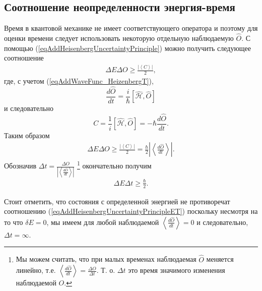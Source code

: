 \subsection{Соотношение неопределенности энергия-время}
\label{AddHeisenbergUncertaintyPrincipleEnergyTime}
Время в квантовой механике не имеет соответствующего оператора и
поэтому для оценки времени следует использовать некоторую отдельную
наблюдаемую $\hat{O}$. С помощью
(\ref{eqAddHeisenbergUncertaintyPrinciple}) можно получить следующее
соотношение
\begin{eqnarray}
  \Delta E \Delta O \ge \frac{\left|\left< C \right>\right|}{2},
  \nonumber
\end{eqnarray}
где, с учетом (\ref{eqAddWaveFunc_HeizenbergT}),
\[
\frac{d \hat{O}}{d t} = \frac{i}{\hbar}
\left[\hat{\mathcal{H}}, \hat{O}\right]
\]
и следовательно
\[
C = \frac{1}{i}\left[\hat{\mathcal{H}}, \hat{O}\right] =
- \hbar \frac{d \hat{O}}{d t}.
\]
Таким образом
\begin{eqnarray}
  \Delta E \Delta O \ge \frac{\left|\left< C \right>\right|}{2} =
  \frac{\hbar}{2}\left|\left<\frac{d \hat{O}}{d t}\right>\right|.
  \nonumber
\end{eqnarray}
Обозначив $\Delta t = \frac{\Delta O}{\left|\left<\frac{d \hat{O}}{d
    t}\right>\right|}$
\footnote{
  Мы можем считать, что при малых временах наблюдаемая $\hat{O}$
  меняется линейно, т.е. $\left<\frac{d \hat{O}}{dt}\right> =
  \frac{\Delta O}{\Delta t}$. Т. о. $\Delta t$ это время значимого
  изменения наблюдаемой $O$. 
}
окончательно получим
\begin{eqnarray}
  \Delta E \Delta t \ge \frac{\hbar}{2}.
  \label{eqAddHeisenbergUncertaintyPrincipleET}
\end{eqnarray}

Стоит отметить, что состояния с определенной энергией не противоречат
соотношению (\ref{eqAddHeisenbergUncertaintyPrincipleET}) поскольку
несмотря на то что $\delta E = 0$, мы имеем для любой наблюдаемой
$\left<\frac{d \hat{O}}{dt}\right> = 0$ и следовательно, $\Delta t =
\infty$. 
